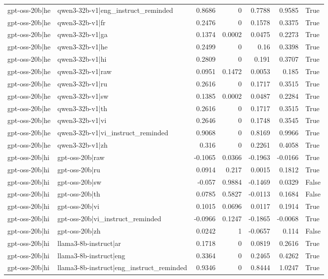 \begin{table}
\begin{tabular}{l l r r r r l}
gpt-oss-20b|he & qwen3-32b-v1|eng_instruct_reminded & 0.8686 & 0 & 0.7788 & 0.9585 & True \\
gpt-oss-20b|he & qwen3-32b-v1|fr & 0.2476 & 0 & 0.1578 & 0.3375 & True \\
gpt-oss-20b|he & qwen3-32b-v1|ga & 0.1374 & 0.0002 & 0.0475 & 0.2273 & True \\
gpt-oss-20b|he & qwen3-32b-v1|he & 0.2499 & 0 & 0.16 & 0.3398 & True \\
gpt-oss-20b|he & qwen3-32b-v1|hi & 0.2809 & 0 & 0.191 & 0.3707 & True \\
gpt-oss-20b|he & qwen3-32b-v1|raw & 0.0951 & 0.1472 & 0.0053 & 0.185 & True \\
gpt-oss-20b|he & qwen3-32b-v1|ru & 0.2616 & 0 & 0.1717 & 0.3515 & True \\
gpt-oss-20b|he & qwen3-32b-v1|sw & 0.1385 & 0.0002 & 0.0487 & 0.2284 & True \\
gpt-oss-20b|he & qwen3-32b-v1|th & 0.2616 & 0 & 0.1717 & 0.3515 & True \\
gpt-oss-20b|he & qwen3-32b-v1|vi & 0.2646 & 0 & 0.1748 & 0.3545 & True \\
gpt-oss-20b|he & qwen3-32b-v1|vi_instruct_reminded & 0.9068 & 0 & 0.8169 & 0.9966 & True \\
gpt-oss-20b|he & qwen3-32b-v1|zh & 0.316 & 0 & 0.2261 & 0.4058 & True \\
gpt-oss-20b|hi & gpt-oss-20b|raw & -0.1065 & 0.0366 & -0.1963 & -0.0166 & True \\
gpt-oss-20b|hi & gpt-oss-20b|ru & 0.0914 & 0.217 & 0.0015 & 0.1812 & True \\
gpt-oss-20b|hi & gpt-oss-20b|sw & -0.057 & 0.9884 & -0.1469 & 0.0329 & False \\
gpt-oss-20b|hi & gpt-oss-20b|th & 0.0785 & 0.5827 & -0.0113 & 0.1684 & False \\
gpt-oss-20b|hi & gpt-oss-20b|vi & 0.1015 & 0.0696 & 0.0117 & 0.1914 & True \\
gpt-oss-20b|hi & gpt-oss-20b|vi_instruct_reminded & -0.0966 & 0.1247 & -0.1865 & -0.0068 & True \\
gpt-oss-20b|hi & gpt-oss-20b|zh & 0.0242 & 1 & -0.0657 & 0.114 & False \\
gpt-oss-20b|hi & llama3-8b-instruct|ar & 0.1718 & 0 & 0.0819 & 0.2616 & True \\
gpt-oss-20b|hi & llama3-8b-instruct|eng & 0.3364 & 0 & 0.2465 & 0.4262 & True \\
gpt-oss-20b|hi & llama3-8b-instruct|eng_instruct_reminded & 0.9346 & 0 & 0.8444 & 1.0247 & True \\

\end{tabular}
\end{table}
